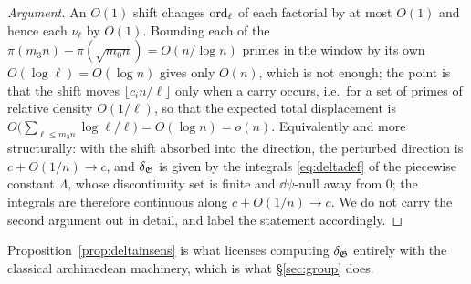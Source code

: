 \begin{proof}[Argument]
An $O(1)$ shift changes $\operatorname{ord}_\ell$ of each factorial by at most $O(1)$ and hence each
$\nu_\ell$ by $O(1)$. Bounding each of the $\pi(m_3n)-\pi(\sqrt{m_0n})=O(n/\log n)$ primes
in the window by its own $O(\log\ell)=O(\log n)$ gives only $O(n)$, which is not enough; the
point is that the shift moves $\lfloor c_in/\ell\rfloor$ only when a carry occurs, i.e.\ for
a set of primes of relative density $O(1/\ell)$, so that the expected total displacement is
$O\bigl(\sum_{\ell\le m_3n}\log\ell/\ell\bigr)=O(\log n)=o(n)$. Equivalently and more
structurally: with the shift absorbed into the direction, the perturbed direction is
$c+O(1/n)\to c$, and $\delta_{\mathfrak{G}}$ is given by the integrals \eqref{eq:deltadef} of the piecewise
constant $\Lambda$, whose discontinuity set is finite and $\dd\psi$-null away from $0$; the
integrals are therefore continuous along $c+O(1/n)\to c$. We do not carry the second
argument out in detail, and label the statement \DERIVED{} accordingly.
\end{proof}

Proposition~\ref{prop:deltainsens} is what licenses computing $\delta_{\mathfrak{G}}$ entirely with the
classical archimedean machinery, which is what \S\ref{sec:group} does.
